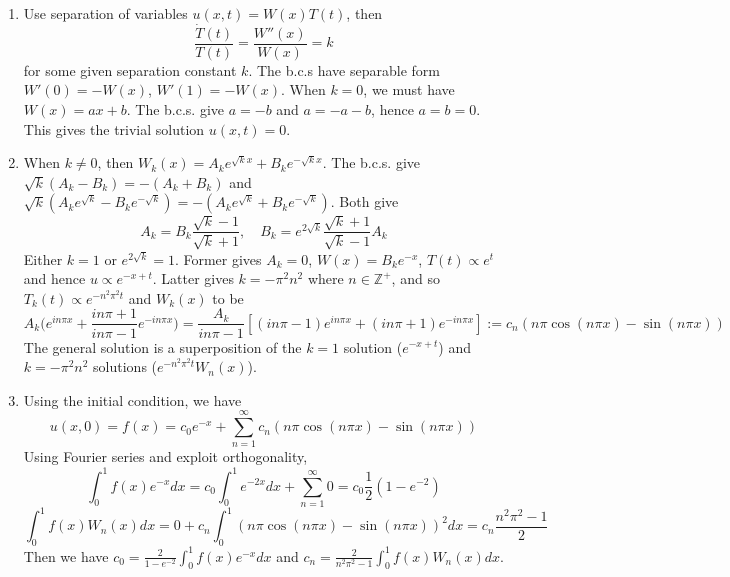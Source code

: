 \documentclass[a4paper]{article}
\begin{document}
\begin{ans}\leavevmode
\begin{enumerate}[label=(\roman*)]
\item Use separation of variables $u(x,t)=W(x)T(t)$, then
$$\frac{\dot{T}(t)}{T(t)}=\frac{W''(x)}{W(x)}=k$$
for some given separation constant $k$. The b.c.s have separable form $W'(0)=-W(x)$, $W'(1)=-W(x)$. When $k=0$, we must have $W(x)=ax+b$. The b.c.s. give $a=-b$ and $a=-a-b$, hence $a=b=0$. This gives the trivial solution $u(x,t)=0$.
\item When $k\neq 0$, then $W_k(x)=A_ke^{\sqrt{k}x}+B_ke^{-\sqrt{k}x}$. The b.c.s. give $\sqrt{k}(A_k-B_k)=-(A_k+B_k)$ and $\sqrt{k}(A_ke^{\sqrt{k}}-B_ke^{-\sqrt{k}})=-(A_ke^{\sqrt{k}}+B_ke^{-\sqrt{k}})$. Both give
$$A_k=B_k\frac{\sqrt{k}-1}{\sqrt{k}+1},\quad B_k=e^{2\sqrt{k}}\frac{\sqrt{k}+1}{\sqrt{k}-1}A_k$$
Either $k=1$ or $e^{2\sqrt{k}}=1$. Former gives $A_k=0$, $W(x)=B_ke^{-x}$, $T(t)\propto e^{t}$ and hence $u\propto e^{-x+t}$. Latter gives $k=-\pi^2n^2$ where $n\in\mathbb{Z}^+$, and so $T_k(t)\propto e^{-n^2\pi^2t}$ and $W_k(x)$ to be
$$A_k\bigg(e^{in\pi x}+\frac{in\pi+1}{in\pi-1}e^{-in\pi x}\bigg)=\frac{A_k}{in\pi -1}[(in\pi -1)e^{in\pi x}+(in\pi +1)e^{-in\pi x}]:=c_n(n\pi\cos(n\pi x)-\sin(n\pi x))$$
The general solution is a superposition of the $k=1$ solution ($e^{-x+t}$) and $k=-\pi^2n^2$ solutions ($e^{-n^2\pi^2t}W_n(x)$).
\newpage
\item Using the initial condition, we have
$$u(x,0)=f(x)=c_0e^{-x}+\sum_{n=1}^\infty c_n(n\pi\cos(n\pi x)-\sin(n\pi x))$$
Using Fourier series and exploit orthogonality,
$$\int_0^1f(x)e^{-x}dx=c_0\int_0^1e^{-2x}dx+\sum_{n=1}^\infty 0=c_0\frac{1}{2}(1-e^{-2})$$
$$\int_0^1f(x)W_n(x)dx=0+c_n\int_0^1(n\pi\cos (n\pi x)-\sin(n\pi x))^2dx=c_n\frac{n^2\pi^2-1}{2}$$
Then we have $c_0=\frac{2}{1-e^{-2}}\int_0^1f(x)e^{-x}dx$ and $c_n=\frac{2}{n^2\pi^2-1}\int_0^1f(x)W_n(x)dx$.
\end{enumerate}
\end{ans}
\end{document}
